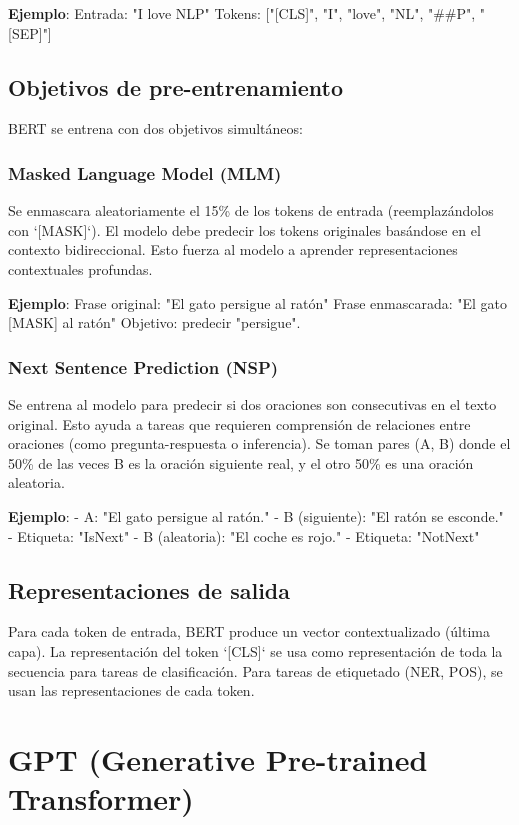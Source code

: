 \documentclass[12pt,a4paper,openany,oneside]{book}
\begin{document}
\textbf{Ejemplo}:
Entrada: "I love NLP"
Tokens: ["[CLS]", "I", "love", "NL", "##P", "[SEP]"]

\subsection{Objetivos de pre-entrenamiento}
BERT se entrena con dos objetivos simultáneos:

\subsubsection{Masked Language Model (MLM)}
Se enmascara aleatoriamente el 15\% de los tokens de entrada (reemplazándolos con `[MASK]`). El modelo debe predecir los tokens originales basándose en el contexto bidireccional. Esto fuerza al modelo a aprender representaciones contextuales profundas.

\textbf{Ejemplo}:
Frase original: "El gato persigue al ratón"
Frase enmascarada: "El gato [MASK] al ratón"
Objetivo: predecir "persigue".

\subsubsection{Next Sentence Prediction (NSP)}
Se entrena al modelo para predecir si dos oraciones son consecutivas en el texto original. Esto ayuda a tareas que requieren comprensión de relaciones entre oraciones (como pregunta-respuesta o inferencia). Se toman pares (A, B) donde el 50\% de las veces B es la oración siguiente real, y el otro 50\% es una oración aleatoria.

\textbf{Ejemplo}:
- A: "El gato persigue al ratón."
- B (siguiente): "El ratón se esconde."
- Etiqueta: "IsNext"
- B (aleatoria): "El coche es rojo."
- Etiqueta: "NotNext"

\subsection{Representaciones de salida}
Para cada token de entrada, BERT produce un vector contextualizado (última capa). La representación del token `[CLS]` se usa como representación de toda la secuencia para tareas de clasificación. Para tareas de etiquetado (NER, POS), se usan las representaciones de cada token.

\section{GPT (Generative Pre-trained Transformer)}
\end{document}
